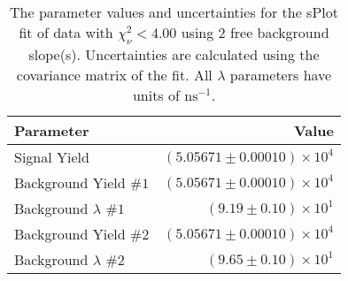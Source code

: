 
\begin{table}
    \begin{center}
        \begin{tabular}{lr}\toprule
            Parameter & Value \\\midrule
            Signal Yield & $(5.05671 \pm 0.00010) \times 10^{4}$ \\
            Background Yield $\#1$ & $(5.05671 \pm 0.00010) \times 10^{4}$ \\
            Background $\lambda$ $\#1$ & $(9.19 \pm 0.10) \times 10^{1}$ \\
            Background Yield $\#2$ & $(5.05671 \pm 0.00010) \times 10^{4}$ \\
            Background $\lambda$ $\#2$ & $(9.65 \pm 0.10) \times 10^{1}$ \\\bottomrule
        \end{tabular}
        \caption{The parameter values and uncertainties for the sPlot fit of data with $\chi^2_\nu < 4.00$ using 2 free background slope(s). Uncertainties are calculated using the covariance matrix of the fit. All $\lambda$ parameters have units of $\si{\nano\second}^{-1}$.}
    \end{center}
\end{table}
